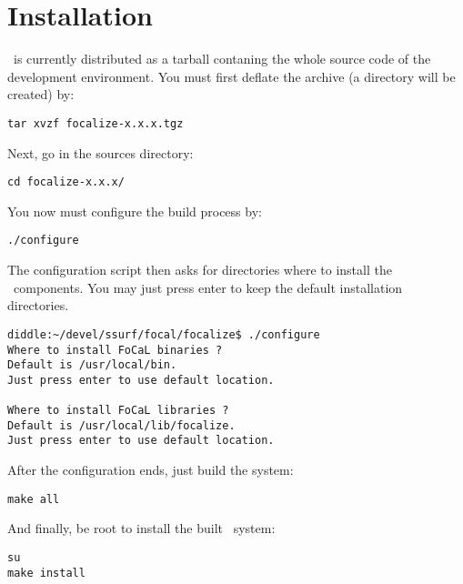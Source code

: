 \section{Installation}
\label{installation}
\focal\ is currently distributed as a tarball contaning the whole
source code of the development environment. You must first deflate the
archive (a directory will be created) by:
\begin{center}
{\tt tar xvzf focalize-x.x.x.tgz}
\end{center}
Next, go in the sources directory:
\begin{center}
{\tt cd focalize-x.x.x/}
\end{center}
You now must configure the build process by:
\begin{center}
{\tt ./configure}
\end{center}
The configuration script then asks for directories where to install
the \focal\ components. You may just press enter to keep the default
installation directories.
\begin{verbatim}
diddle:~/devel/ssurf/focal/focalize$ ./configure 
Where to install FoCaL binaries ?
Default is /usr/local/bin.
Just press enter to use default location.

Where to install FoCaL libraries ?
Default is /usr/local/lib/focalize.
Just press enter to use default location.
\end{verbatim}
After the configuration ends, just build the system:
\begin{center}
{\tt make all}
\end{center}
And finally, be root to install the built \focal\ system:
\begin{center}
{\tt su}\\
{\tt make install}
\end{center}
